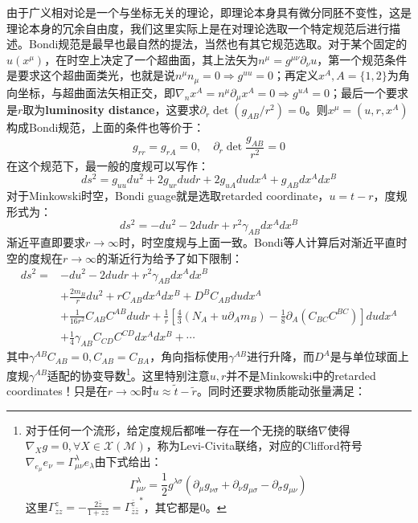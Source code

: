 由于广义相对论是一个与坐标无关的理论，即理论本身具有微分同胚不变性，这是理论本身的冗余自由度，我们这里实际上是在对理论选取一个特定规范后进行描述。Bondi规范是最早也最自然的提法，当然也有其它规范选取\cite{Campiglia:2015kxa,Campiglia:2015lxa}。对于某个固定的$u(x^\mu)$，在时空上决定了一个超曲面，其上法矢为$n^\mu=g^{\mu\nu}\partial_\nu u$，第一个规范条件是要求这个超曲面类光，也就是说$n^\mu n_\mu=0\Rightarrow g^{uu}=0$；再定义$x^A,A=\{1,2\}$为角向坐标，与超曲面法矢相正交，即$\nabla_n x^A=n^\mu\partial_\mu x^A=0\Rightarrow g^{uA}=0$；最后一个要求是$r$取为\textbf{luminosity distance}，这要求$\partial_r \det (g_{AB}/r^2)=0$。则$x^\mu=(u,r,x^A)$构成Bondi规范，上面的条件也等价于：
\begin{equation}
	g_{rr}=g_{rA}=0,\quad \partial_r\det\frac{g_{AB}}{r^2}=0
\end{equation}
在这个规范下，最一般的度规可以写作：
\begin{equation}
	ds^2=g_{uu}du^2+2g_{ur}dudr+2g_{uA}dudx^A+g_{AB}dx^Adx^B
\end{equation}
对于Minkowski时空，Bondi guage就是选取retarded coordinate，$u=t-r$，度规形式为：
\begin{equation}
	ds^2=-du^2-2dudr+r^2\gamma_{AB}dx^Adx^B
\end{equation}
渐近平直即要求$r\to\infty$时，时空度规与上面一致。Bondi等人计算后对渐近平直时空的度规在$r\to\infty$的渐近行为给予了如下限制\cite{Bondi:1962px,Sachs:1962wk}：
\begin{equation}\label{eq:17.4}
	\begin{aligned}
		ds^2=&-du^2-2dudr+r^2\gamma_{AB}dx^Adx^B\\
		&+\frac{2m_B}{r}du^2+rC_{AB}dx^Adx^B+D^B C_{AB}dudx^A\\
		&+\frac{1}{16r^2}C_{AB}C^{AB}dudr+\frac{1}{r}\left[\frac{4}{3}\left(N_A+u\partial_Am_B\right)-\frac{1}{8}\partial_A\left(C_{BC}C^{BC}\right)\right]dudx^A\\
		&+\frac{1}{4}\gamma_{AB}C_{CD}C^{CD}dx^Adx^B+\cdots
	\end{aligned}
\end{equation}
其中$\gamma^{AB}C_{AB}=0,C_{AB}=C_{BA}$，角向指标使用$\gamma^{AB}$进行升降，而$D^A$是与单位球面上度规$\gamma^{AB}$适配的协变导数\footnote{对于任何一个流形，给定度规后都唯一存在一个无挠的联络$\nabla$使得$\nabla_X g=0,\forall X\in\mathscr{X}(\mathcal{M})$，称为Levi-Civita联络，对应的Clifford符号$\nabla_{e_\mu}e_\nu=\Gamma_{\mu\nu}^{\lambda}e_\lambda$由下式给出：
\[\Gamma^\lambda_{\mu\nu}=\frac{1}{2}g^{\lambda\sigma}\left(\partial_\mu g_{\nu\sigma}+\partial_\nu g_{\mu\sigma}-\partial_\sigma g_{\mu\nu}\right)\]这里$\Gamma^{z}_{zz}=-\frac{2\bar z}{1+z\bar z}={\Gamma^{\bar z}_{\bar z\bar z}}^*$，其它都是0。}。这里特别注意$u,r$并不是Minkowski中的retarded coordinates！只是在$r\to\infty$时$u\approx \tilde t-\tilde r$。同时还要求物质能动张量满足：
